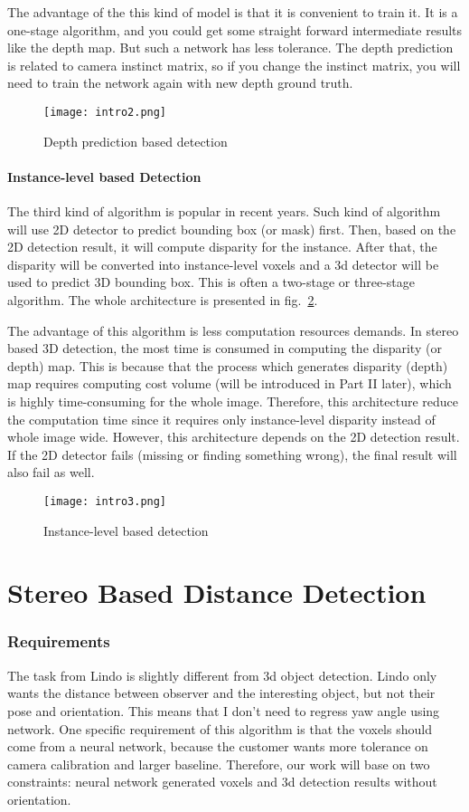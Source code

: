 \documentclass[12pt]{article}
\begin{document}
The advantage of the this kind of model is that it is convenient to train it. It is a one-stage algorithm, and you could get some straight forward intermediate results like the depth map. But such a network has less tolerance. The depth prediction is related to camera instinct matrix, so if you change the instinct matrix, you will need to train the network again with new depth ground truth.
\begin{figure}[H]
    \centering
    \texttt{[image: intro2.png]}
    \caption{Depth prediction based detection}
    \label{intro2}
\end{figure}
\subsection{Instance-level based Detection}
The third kind of algorithm is popular in recent years. Such kind of algorithm will use 2D detector to predict bounding box (or mask) first. Then, based on the 2D detection result, it will compute disparity for the instance. After that, the disparity will be converted into instance-level voxels and a 3d detector will be used to predict 3D bounding box. This is often a two-stage or three-stage algorithm. The whole architecture is presented in fig.~\ref{intro3}.

The advantage of this algorithm is less computation resources demands. In stereo based 3D detection, the most time is consumed in computing the disparity (or depth) map. This is because that the process which generates disparity (depth) map requires computing cost volume (will be introduced in Part II later), which is highly time-consuming for the whole image. Therefore, this architecture reduce the computation time since it requires only instance-level disparity instead of whole image wide. However, this architecture depends on the 2D detection result. If the 2D detector fails (missing or finding something wrong), the final result will also fail as well.
\begin{figure}[H]
    \centering
    \texttt{[image: intro3.png]}
    \caption{Instance-level based detection}
    \label{intro3}
\end{figure}
\part{Stereo Based Distance Detection}
\section{Requirements}
The task from Lindo is slightly different from 3d object detection. Lindo only wants the distance between observer and the interesting object, but not their pose and orientation. This means that I don’t need to regress yaw angle using network. One specific requirement of this algorithm is that the voxels should come from a neural network, because the customer wants more tolerance on camera calibration and larger baseline. Therefore, our work will base on two constraints: neural network generated voxels and 3d detection results without orientation.
\end{document}
